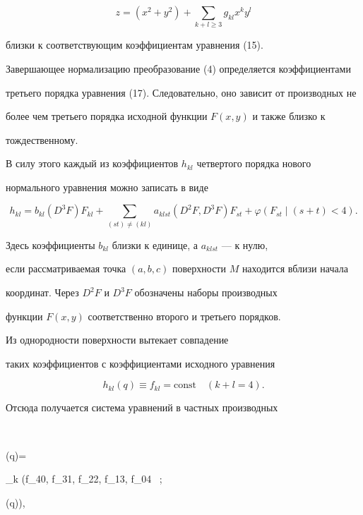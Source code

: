 \begin{equation}


z=(x^2+y^2)+\sum_{k+l \ge 3} g_{kl} x^k y^l


\end{equation}


близки к соответствующим коэффициентам уравнения (15).


Завершающее нормализацию преобразование (4) определяется коэффициентами


третьего порядка уравнения (17). Следовательно, оно зависит от производных не


более чем третьего порядка исходной функции $F(x,y)$ и также близко к


тождественному.


В силу этого каждый из коэффициентов $h_{kl}$ четвертого порядка нового


нормального уравнения можно записать в виде


$$


h_{kl}=b_{kl} (D^3F) F_{kl}+


\sum_{(st) \ne (kl)} a_{klst} (D^2 F, D^3 F) F_{st}+


\varphi(F_{st} \mid (s+t) < 4).


$$


Здесь коэффициенты $b_{kl}$ близки к единице, а $a_{klst}$ --- к нулю,


если рассматриваемая точка $(a,b,c)$ поверхности $M$ находится вблизи начала


координат. Через $D^2 F$ и $D^3 F$ обозначены наборы производных


функции $F(x,y)$ соответственно второго и третьего порядков.





Из однородности поверхности вытекает совпадение


таких коэффициентов с коэффициентами исходного уравнения


$$


h_{kl}(q) \equiv f_{kl}=\text{const} \quad (k+l=4).


$$


Отсюда получается система уравнений в частных производных


$$


(q)=


\varphi_k \bigg(f_{40}, f_{31}, f_{22}, f_{13}, f_{04} \ ;


(q)\bigg),


